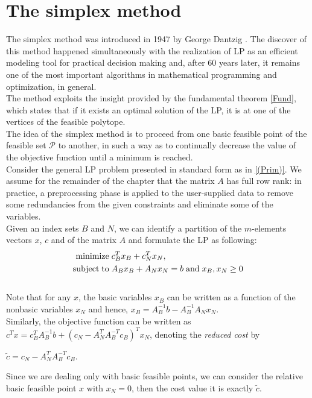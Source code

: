 \documentclass[a4paper,10 pt,titlepage,twoside]{book}
\theoremstyle{plain}
\theoremstyle{definition}
\theoremstyle{remark}
\begin{document}
\chapter{The simplex method}
The simplex method was introduced in 1947 by George Dantzig \cite{DAN1}. The discover of this method happened simultaneously with the realization of LP as an efficient modeling tool for practical decision making and, after 60 years later, it remains one of the most important algorithms in mathematical programming and
optimization, in general.\\
The method exploits the insight provided by the fundamental theorem
\ref{Fund}, which states that if it exists an optimal solution of the LP, it is at one of the vertices of the feasible polytope. \\
The idea of the simplex method is to proceed from one basic feasible point of the feasible set $\mathcal{P}$ to another, in such a way as to continually decrease the value of the objective
function until a minimum is reached.\\ Consider the general LP problem presented in standard form as in \ref{(Prim)}.
We assume for the remainder of the chapter that the matrix $A$ has full row rank: in practice, a preprocessing phase is applied to the user-supplied data to remove some
redundancies from the given constraints and eliminate some of the variables.\\Given an index sets $B$ and $N$, we can identify a partition of the $m$-elements vectors $x$, $c$ and of the matrix $A$ and formulate the LP as following:
\begin{equation}
\begin{split}
\text{minimize\;} &c^{T}_{B}x_{B}+c^{T}_{N}x_{N},\\
\text{subject\;to\;}&A_{B}x_{B}+A_{N}x_{N} = b\text{\;and\;}x_{B}, x_{N}\geq0
\end{split}
\end{equation}
 \\Note that for any $x$, the basic variables $x_{B}$ can be written as a function of the nonbasic variables $x_{N}$ and hence, $x_{B}=A_{B}^{-1}b-A_{B}^{-1}A_{N}x_{N}$. \\Similarly, the objective function can be written as $c^{T}x=c_{B}^{T}A_{B}^{-1}b+(c_{N}-A_{N}^{T}A_{B}^{-T}c_{B})^{T}x_{N}$, denoting the \textit{reduced cost} by \begin{center}
 	$\widetilde{c}=c_{N}-A_{N}^{T}A_{B}^{-T}c_{B}$.
 \end{center}Since we are dealing only with basic feasible points, we can consider the relative basic feasible point $x$ with $x_{N}= 0$, then the cost value it is exactly $\widetilde{c}$.\\
\end{document}
